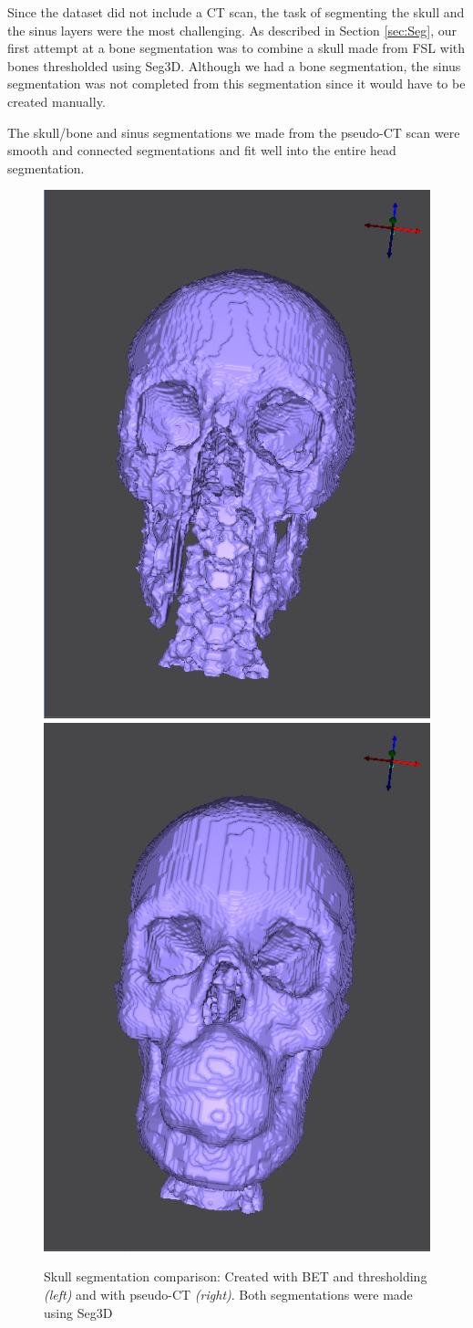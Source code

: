 Since the dataset did not include a CT scan, the task of segmenting the skull and the sinus layers were the most challenging. As described in Section \ref{sec:Seg}, our first attempt at a bone segmentation was to combine a skull made from FSL \cite{ref:bet2} with bones thresholded using Seg3D. Although we had a bone segmentation, the sinus segmentation was not completed from this segmentation since it would have to be created manually.

The skull/bone and sinus segmentations we made from the pseudo-CT scan were smooth and connected segmentations and fit well into the entire head segmentation.

\begin{figure}[H]
\begin{center}
\includegraphics[width=.49\textwidth]{Figures/skull_before}
\includegraphics[width=.49\textwidth]{Figures/skull_after}
\caption{Skull segmentation comparison: Created with BET and thresholding \textit{(left)} and with pseudo-CT \textit{(right)}. Both segmentations were made using Seg3D}
\label{fig:skull}
\end{center}
\end{figure}

